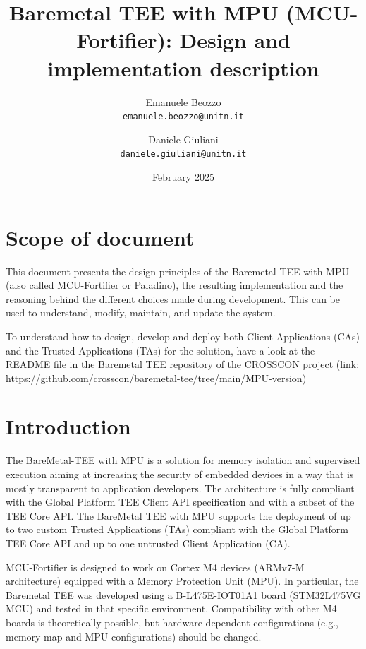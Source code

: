 \documentclass{article}
\title{
Baremetal TEE with MPU (MCU-Fortifier): 
Design and implementation description
}
\author{
Emanuele Beozzo\\
\texttt{emanuele.beozzo@unitn.it}
\and
Daniele Giuliani\\
\texttt{daniele.giuliani@unitn.it}
}
\date{February 2025}
\begin{document}
\maketitle
\newpage
\begin{versionhistory}
\end{versionhistory}

\newpage
\tableofcontents


\newpage
\section{Scope of document}
This document presents the design principles of the Baremetal TEE with MPU (also called MCU-Fortifier or Paladino), the resulting implementation and the reasoning behind the different choices made during development. This can be used to understand, modify, maintain, and update the system.  

To understand how to design, develop and deploy both Client Applications (CAs) and the Trusted Applications (TAs) for the solution, have a look at the README file in the Baremetal TEE repository of the CROSSCON project (link: \url{https://github.com/crosscon/baremetal-tee/tree/main/MPU-version})

\newpage
\section{Introduction}
\label{sec:intro}

The BareMetal-TEE with MPU is a solution for memory isolation and supervised execution aiming at increasing the security of embedded devices in a way that is mostly transparent to application developers. The architecture is fully compliant with the Global Platform TEE Client API specification and with a subset of the TEE Core API. The BareMetal TEE with MPU supports the deployment of up to two custom Trusted Applications (TAs) compliant with the Global Platform TEE Core API and up to one untrusted Client Application (CA).


MCU-Fortifier is designed to work on Cortex M4 devices (ARMv7-M architecture) equipped with a Memory Protection Unit (MPU). In particular, the Baremetal TEE was developed using a B-L475E-IOT01A1 board (STM32L475VG MCU) and tested in that specific environment. Compatibility with other M4 boards is theoretically possible, but hardware-dependent configurations (e.g., memory map and MPU configurations) should be changed.
\end{document}
